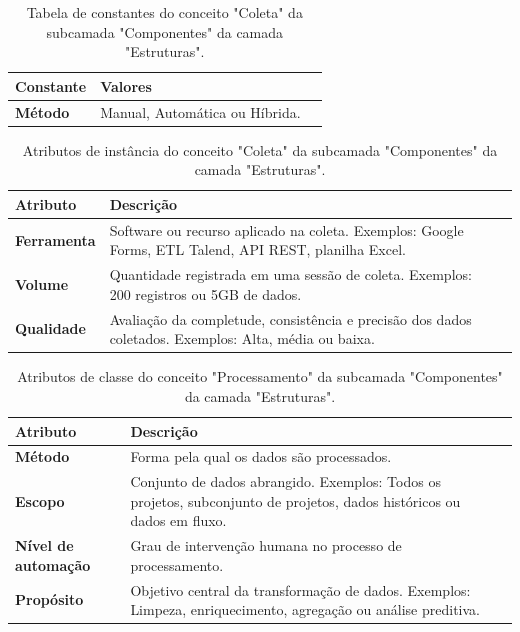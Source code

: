 \begin{apendicesenv}
\begin{table}[H]
\centering
\caption{Tabela de constantes do conceito "Coleta" da subcamada "Componentes" da camada "Estruturas".}
\begin{tabularx}{\textwidth}{|l|X|X|}
\hline
\textbf{Constante} & \textbf{Valores} \\ \hline
\textbf{Método} & Manual, Automática ou Híbrida. \\ \hline
\end{tabularx}
\end{table}

\begin{table}[H]
\centering
\caption{Atributos de instância do conceito "Coleta" da subcamada "Componentes" da camada "Estruturas".}
\begin{tabularx}{\textwidth}{|l|X|X|}
\hline
\textbf{Atributo} & \textbf{Descrição} \\ \hline
\textbf{Ferramenta} & Software ou recurso aplicado na coleta. Exemplos: Google Forms, ETL Talend, API REST, planilha Excel. \\ \hline
\textbf{Volume} & Quantidade registrada em uma sessão de coleta. Exemplos: 200 registros ou 5GB  de dados. \\ \hline
\textbf{Qualidade} & Avaliação da completude, consistência e precisão dos dados coletados. Exemplos: Alta, média ou baixa.\\ \hline
\end{tabularx}
\end{table}

\begin{table}[H]
\centering
\caption{Atributos de classe do conceito "Processamento" da subcamada "Componentes" da camada "Estruturas".}
\begin{tabularx}{\textwidth}{|l|X|X|}
\hline
\textbf{Atributo} & \textbf{Descrição} \\ \hline
\textbf{Método} & Forma pela qual os dados são processados.\\ \hline
\textbf{Escopo} & Conjunto de dados abrangido. Exemplos: Todos os projetos, subconjunto de projetos, dados históricos ou dados em fluxo.  \\ \hline
\textbf{Nível de automação} & Grau de intervenção humana no processo de processamento. \\ \hline
\textbf{Propósito} & Objetivo central da transformação de dados. Exemplos: Limpeza, enriquecimento, agregação ou análise preditiva. \\ \hline
\end{tabularx}
\end{table}


\end{apendicesenv}
